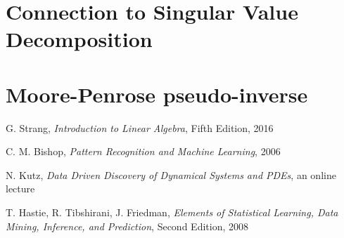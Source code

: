 \documentclass[10pt,twocolumn]{article}
\begin{document}
\section{Connection to Singular Value Decomposition}




\section{Moore-Penrose pseudo-inverse}


\newpage


\thebibliography{}



 G. Strang, \textit{Introduction to Linear Algebra}, Fifth Edition, 2016

 C. M. Bishop, \textit{Pattern Recognition and Machine Learning}, 2006

 N. Kutz, \textit{Data Driven Discovery of Dynamical Systems and PDEs}, an online lecture 

 T. Hastie, R. Tibshirani, J. Friedman, \textit{Elements of Statistical Learning, Data Mining, Inference, and Prediction}, Second Edition, 2008

 \label{bib:pope}
\end{document}

